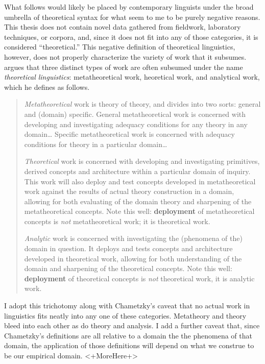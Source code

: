 \documentclass[MilwayThesis]{subfiles}
\begin{document}
What follows would likely be placed by contemporary linguists under the broad umbrella of theoretical syntax for what seem to me to be purely negative reasons.
This thesis does not contain novel data gathered from fieldwork, laboratory techniques, or corpora, and, since it does not fit into any of those categories, it is considered ``theoretical.''
This negative definition of theoretical linguistics, however, does not properly characterize the variety of work that it subsumes.
\textcite{chametzky1996theory} argues that three distinct types of work are often subsumed under the name \textit{theoretical linguistics}: metatheoretical work, heoretical work, and analytical work, which he defines as follows.
\begin{quotation}
	\textit{Metatheoretical} work is theory of theory, and divides into two sorts: general and (domain) specific. 
	General metatheoretical work is concerned with developing and investigating adequacy conditions for any theory in any domain\dots
	Specific metatheoretical work is concerned with adequacy conditions for theory in a particular domain\dots

	\textit{Theoretical} work is concerned with developing and investigating primitives, derived concepts and architecture within a particular domain of inquiry.
	This work will also deploy and test concepts developed in metatheoretical work against the results of actual theory construction in a domain, allowing for both evaluating of the domain theory and sharpening of the metatheoretical concepts.
	Note this well: \textbf{deployment} of metatheoretical concepts is \textit{not} metatheoretical work; it is theoretical work.

	\textit{Analytic} work is concerned with investigating the (phenomena of the) domain in question.
	It deploys and tests concepts and architecture developed in theoretical work, allowing for both understanding of the domain and sharpening of the theoretical concepts.
	Note this well: \textbf{deployment} of theoretical concepts is \textit{not} theoretical work, it is analytic work.
\end{quotation}
I adopt this trichotomy along with Chametzky's caveat that no actual work in linguistics fits neatly into any one of these categories.
Metatheory and theory bleed into each other as do theory and analysis.
I add a further caveat that, since Chametzky's definitions are all relative to a domain the the phenomena of that domain, the application of those definitions will depend on what we construe to be our empirical domain.
<+MoreHere+>
\end{document}
